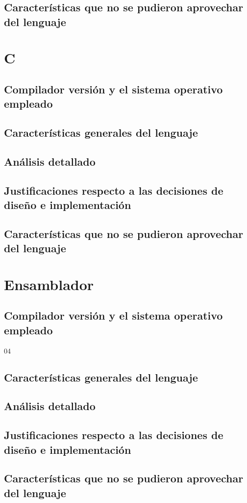 \documentclass[]{scrartcl}
\begin{document}
    \subsection{Caracter\'isticas que no se pudieron aprovechar del lenguaje}
      \section{C}
       \subsection{Compilador versi\'on y el sistema operativo empleado}
        \subsection{Caracter\'isticas generales del lenguaje}
        \subsection{An\'alisis detallado}
        \subsection{Justificaciones respecto a las decisiones de diseño e implementaci\'on}
        \subsection{Caracter\'isticas que no se pudieron aprovechar del lenguaje}
          \section{Ensamblador}
           \subsection{Compilador versi\'on y el sistema operativo empleado}04
            \subsection{Caracter\'isticas generales del lenguaje}
            \subsection{An\'alisis detallado}
            \subsection{Justificaciones respecto a las decisiones de diseño e implementaci\'on}
            \subsection{Caracter\'isticas que no se pudieron aprovechar del lenguaje}
\end{document}
